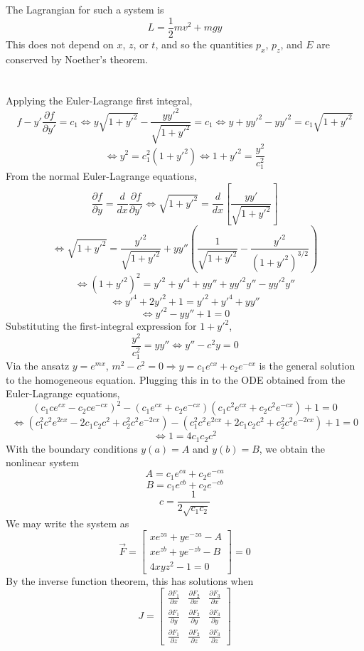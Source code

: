 \documentclass{article}
\begin{document}
\section{}
The Lagrangian for such a system is
\[L=\frac{1}{2}mv^2+mgy\]
This does not depend on $x$, $z$, or $t$, and so the quantities $p_x$, $p_z$, and $E$ are conserved by Noether's theorem.

\section{}
Applying the Euler-Lagrange first integral,
\[f-y'\frac{\partial f}{\partial y'}=c_1\Leftrightarrow y\sqrt{1+y'^2}-\frac{yy'^2}{\sqrt{1+y'^2}}=c_1\Leftrightarrow y+yy'^2-yy'^2=c_1\sqrt{1+y'^2}\]
\[\Leftrightarrow y^2=c_1^2(1+y'^2)\Leftrightarrow 1+y'^2= \frac{y^2}{c_1^2}\]
From the normal Euler-Lagrange equations,
\[\frac{\partial f}{\partial y}=\frac{d}{dx}\frac{\partial f}{\partial y'}\Leftrightarrow \sqrt{1+y'^2}=\frac{d}{dx}\left[ \frac{yy'}{\sqrt{1+y'^2}} \right]\]
\[\Leftrightarrow \sqrt{1+y'^2}=\frac{y'^2}{\sqrt{1+y'^2}}+yy''\left(\frac{1}{\sqrt{1+y'^2}}- \frac{y'^2}{(1+y'^2)^{3/2}} \right)\]
\[\Leftrightarrow (1+y'^2)^2=y'^2+y'^4+yy''+yy'^2y''-yy'^2y''\]
\[\Leftrightarrow y'^4+2y'^2+1=y'^2+y'^4+yy''\]\[\Leftrightarrow y'^2-yy''+1=0\]
Substituting the first-integral expression for $1+y'^2$,
\[\frac{y^2}{c_1^2}=yy''\Leftrightarrow y''-c^2y=0\]
Via the ansatz $y=e^{mx}$, $m^2-c^2=0\Rightarrow y=c_1e^{cx}+c_2e^{-cx}$ is the general solution to the homogeneous equation.
Plugging this in to the ODE obtained from the Euler-Lagrange equations,
\[\left( c_1ce^{cx}-c_2ce^{-cx} \right)^2-\left( c_1e^{cx}+c_2e^{-cx} \right)\left( c_1c^2e^{cx}+c_2c^2e^{-cx} \right)+1=0\]
\[\Leftrightarrow \left( c_1^2c^2e^{2cx}-2c_1c_2c^2+c_2^2c^2e^{-2cx} \right)-\left( c_1^2c^2e^{2cx}+2c_1c_2c^2+c_2^2c^2e^{-2cx} \right)+1=0\]
\[\Leftrightarrow 1 = 4c_1c_2c^2\]
With the boundary conditions $y(a)=A$ and $y(b)=B$, we obtain the nonlinear system
\[A=c_1e^{ca}+c_2e^{-ca}\]
\[B=c_1e^{cb}+c_2e^{-cb}\]
\[c=\frac{1}{2\sqrt{c_1c_2}}\]
We may write the system as
\[\vec{F}=\begin{bmatrix}
    xe^{za}+ye^{-za} - A \\
    xe^{zb}+ye^{-zb}-B \\
    4xyz^2-1=0
  \end{bmatrix} = 0\]
By the inverse function theorem, this has solutions when
\[J=\begin{bmatrix}
    \frac{\partial F_1}{\partial x} & \frac{\partial F_2}{\partial x} & \frac{\partial F_3}{\partial x} \\
    \frac{\partial F_1}{\partial y} & \frac{\partial F_2}{\partial y} & \frac{\partial F_3}{\partial y} \\
    \frac{\partial F_1}{\partial z} & \frac{\partial F_2}{\partial z} & \frac{\partial F_3}{\partial z}
  \end{bmatrix}\]
\end{document}
